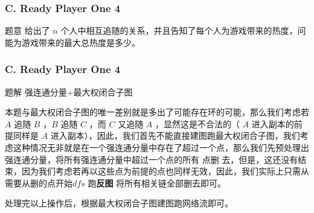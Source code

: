 \renewcommand{\problemname}{C. Ready Player One 4}

\begin{frame}\frametitle{\problemname}
	
	\begin{block}{题意}
		给出了 $n$ 个人中相互追随的关系，并且告知了每个人为游戏带来的热度，问能为游戏带来的最大总热度是多少。
	\end{block}
\end{frame}

\begin{frame}\frametitle{\problemname}
	
	\begin{block}{题解}
		强连通分量+最大权闭合子图

		本题与最大权闭合子图的唯一差别就是多出了可能存在环的可能，那么我们考虑若 $A$ 追随 $B$ ，$B$ 追随 $C$ ，而 $C$ 又追随 		$A$ ，显然这是不合法的（ $A$ 进入副本的前提同样是 $A$ 进入副本），因此，我们首先不能直接建图跑最大权闭合子图，我们考			虑这种情况无非就是在一个强连通分量中存在了超过一个点，那么我们先预处理出强连通分量，将所有强连通分量中超过一个点的所有			点删	去，但是，这还没有结束，因为我们考虑若再以这些点为前提的点也同样无效，因此，我们实际上只需从需要从删的点开始$dfs$ 		跑\textbf{反图} 将所有相关链全部删去即可。

		处理完以上操作后，根据最大权闭合子图建图跑网络流即可。
	\end{block}
\end{frame}